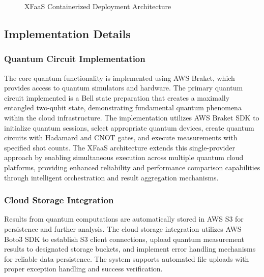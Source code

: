 \documentclass[onecolumn]{IEEEtran}
\begin{document}
\begin{figure}[ht]
{
}
\caption{XFaaS Containerized Deployment Architecture}
\label{fig:xfaas_containers}
\end{figure}

\subsection{Implementation Details}

\subsubsection{Quantum Circuit Implementation}

The core quantum functionality is implemented using AWS Braket, which provides access to quantum simulators and hardware. The primary quantum circuit implemented is a Bell state preparation that creates a maximally entangled two-qubit state, demonstrating fundamental quantum phenomena within the cloud infrastructure. The implementation utilizes AWS Braket SDK to initialize quantum sessions, select appropriate quantum devices, create quantum circuits with Hadamard and CNOT gates, and execute measurements with specified shot counts. The XFaaS architecture extends this single-provider approach by enabling simultaneous execution across multiple quantum cloud platforms, providing enhanced reliability and performance comparison capabilities through intelligent orchestration and result aggregation mechanisms.

\subsubsection{Cloud Storage Integration}

Results from quantum computations are automatically stored in AWS S3 for persistence and further analysis. The cloud storage integration utilizes AWS Boto3 SDK to establish S3 client connections, upload quantum measurement results to designated storage buckets, and implement error handling mechanisms for reliable data persistence. The system supports automated file uploads with proper exception handling and success verification.
\end{document}
